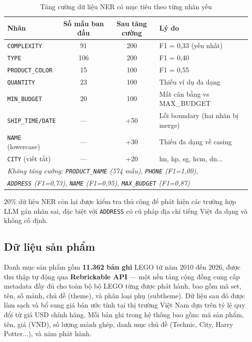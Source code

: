 \documentclass[12pt, a4paper]{report}
\begin{document}
\begin{table}[H]
\centering
\caption{Tăng cường dữ liệu NER có mục tiêu theo từng nhãn yếu}
\label{tab:ner_augment}
\begin{tabular}{lccl}
\toprule
\textbf{Nhãn} & \textbf{Số mẫu ban đầu} & \textbf{Sau tăng cường} & \textbf{Lý do} \\
\midrule
\texttt{COMPLEXITY}      & 91  & 200 & F1 = 0,33 (yếu nhất) \\
\texttt{TYPE}            & 106 & 200 & F1 = 0,40 \\
\texttt{PRODUCT\_COLOR}  & 15  & 100 & F1 = 0,55 \\
\texttt{QUANTITY}        & 23  & 100 & Thiếu ví dụ đa dạng \\
\texttt{MIN\_BUDGET}     & 20  & 100 & Mất cân bằng vs MAX\_BUDGET \\
\texttt{SHIP\_TIME/DATE} & ---  & +50 & Lỗi boundary (hai nhãn bị merge) \\
\texttt{NAME} (lowercase)& ---  & +30 & Thiếu đa dạng về casing \\
\texttt{CITY} (viết tắt) & ---  & +20 & hn, hp, sg, hcm, dn... \\
\midrule
\multicolumn{4}{l}{\textit{Không tăng cường: \texttt{PRODUCT\_NAME} (574 mẫu),
\texttt{PHONE} (F1=1,00),}} \\
\multicolumn{4}{l}{\textit{\texttt{ADDRESS} (F1=0,73), \texttt{NAME} (F1=0,95),
\texttt{MAX\_BUDGET} (F1=0,87)}} \\
\bottomrule
\end{tabular}
\end{table}

20\% dữ liệu NER còn lại được kiểm tra thủ công để phát hiện
các trường hợp LLM gán nhãn sai, đặc biệt với \texttt{ADDRESS}
có cú pháp địa chỉ tiếng Việt đa dạng và không cố định.

\subsection{Dữ liệu sản phẩm}

Danh mục sản phẩm gồm \textbf{11.362 bản ghi} LEGO từ năm 2010 đến 2026,
được thu thập tự động qua \textbf{Rebrickable API} \cite{rebrickable}
--- một nền tảng cộng đồng cung cấp metadata đầy đủ cho toàn bộ
bộ LEGO từng được phát hành, bao gồm mã set, tên, số mảnh,
chủ đề (theme), và phân loại phụ (subtheme).
Dữ liệu sau đó được làm sạch và bổ sung giá bán ước tính
tại thị trường Việt Nam dựa trên tỷ lệ quy đổi từ giá USD chính hãng.
Mỗi bản ghi trong hệ thống bao gồm: mã sản phẩm, tên, giá (VNĐ),
số lượng mảnh ghép, danh mục chủ đề (Technic, City, Harry Potter...),
và năm phát hành.
\end{document}
